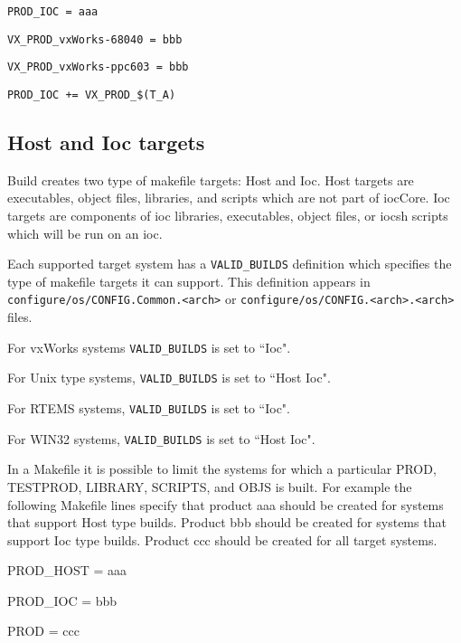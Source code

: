 \begin{description}
\item \verb|PROD_IOC = aaa|
\item \verb|VX_PROD_vxWorks-68040 = bbb|
\item \verb|VX_PROD_vxWorks-ppc603 = bbb|
\item \verb|PROD_IOC += VX_PROD_$(T_A)|
\end{description}
\subsection{Host and Ioc targets}

Build creates two type of makefile targets: Host and Ioc. Host targets are executables, object files, libraries, and scripts 
which are not part of iocCore. Ioc targets are components of ioc libraries, executables, object files, or iocsh scripts which 
will be run on an ioc.

Each supported target system has a \verb|VALID_BUILDS| definition which specifies the type of makefile targets it can 
support. This definition appears in \verb|configure/os/CONFIG.Common.<arch>| or \verb|configure/os/CONFIG.<arch>.<arch>| files.
\begin{description}
\item For vxWorks systems \verb|VALID_BUILDS| is set to ``Ioc".
\item For Unix type systems, \verb|VALID_BUILDS| is set to ``Host Ioc".
\item For RTEMS systems, \verb|VALID_BUILDS| is set to ``Ioc".
\item For WIN32 systems, \verb|VALID_BUILDS| is set to ``Host Ioc".
\end{description}

In a Makefile it is possible to limit the systems for which a particular PROD, TESTPROD, LIBRARY, SCRIPTS, and 
OBJS is built. For example the following Makefile lines specify that product aaa should be created for systems that 
support Host type builds. Product bbb should be created for systems that support Ioc type builds. Product ccc should be 
created for all target systems.

\begin{description}
\item PROD\_HOST = aaa

\item PROD\_IOC = bbb

\item PROD = ccc

\end{description}

